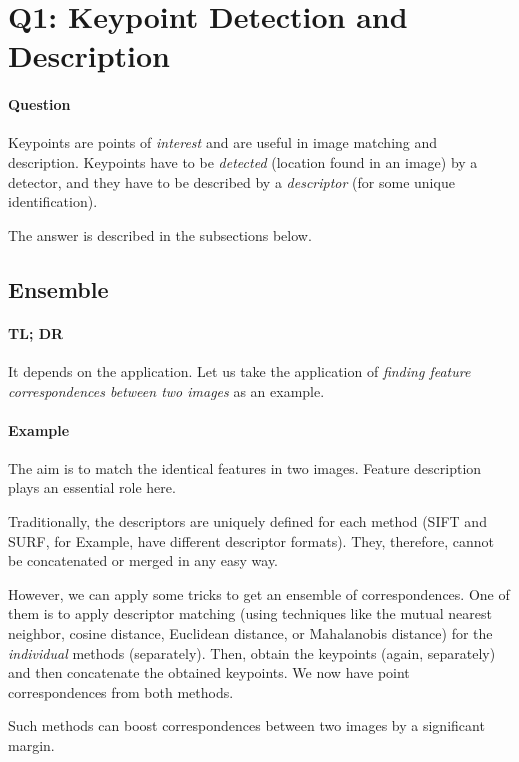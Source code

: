 
\section{Q1: Keypoint Detection and Description}

\paragraph*{Question}
\begin{displayquote}
    
\end{displayquote}

Keypoints are points of \emph{interest} and are useful in image matching and description. Keypoints have to be \emph{detected} (location found in an image) by a detector, and they have to be described by a \emph{descriptor} (for some unique identification).

The answer is described in the subsections below.





\subsection{Ensemble}

\paragraph*{TL; DR}
It depends on the application. Let us take the application of \emph{finding feature correspondences between two images} as an example.

\paragraph*{Example}

The aim is to match the identical features in two images. Feature description plays an essential role here.

Traditionally, the descriptors are uniquely defined for each method (SIFT and SURF, for Example, have different descriptor formats). They, therefore, cannot be concatenated or merged in any easy way. 

However, we can apply some tricks to get an ensemble of correspondences. One of them is to apply descriptor matching (using techniques like the mutual nearest neighbor, cosine distance, Euclidean distance, or Mahalanobis distance) for the \emph{individual} methods (separately). Then, obtain the keypoints (again, separately) and then concatenate the obtained keypoints. We now have point correspondences from both methods.

Such methods can boost correspondences between two images by a significant margin.
